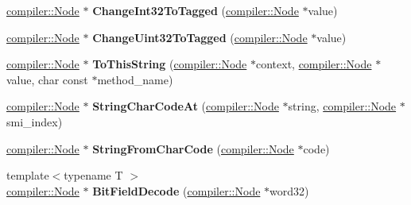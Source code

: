 \begin{DoxyCompactItemize}
\item 
\hyperlink{classv8_1_1internal_1_1compiler_1_1_node}{compiler\+::\+Node} $\ast$ {\bfseries Change\+Int32\+To\+Tagged} (\hyperlink{classv8_1_1internal_1_1compiler_1_1_node}{compiler\+::\+Node} $\ast$value)\hypertarget{classv8_1_1internal_1_1_code_stub_assembler_a14effc2655c4440dbef6090dbdcff437}{}\label{classv8_1_1internal_1_1_code_stub_assembler_a14effc2655c4440dbef6090dbdcff437}

\item 
\hyperlink{classv8_1_1internal_1_1compiler_1_1_node}{compiler\+::\+Node} $\ast$ {\bfseries Change\+Uint32\+To\+Tagged} (\hyperlink{classv8_1_1internal_1_1compiler_1_1_node}{compiler\+::\+Node} $\ast$value)\hypertarget{classv8_1_1internal_1_1_code_stub_assembler_aa9c411efc4ce30f9dfa85d808c87d0e5}{}\label{classv8_1_1internal_1_1_code_stub_assembler_aa9c411efc4ce30f9dfa85d808c87d0e5}

\item 
\hyperlink{classv8_1_1internal_1_1compiler_1_1_node}{compiler\+::\+Node} $\ast$ {\bfseries To\+This\+String} (\hyperlink{classv8_1_1internal_1_1compiler_1_1_node}{compiler\+::\+Node} $\ast$context, \hyperlink{classv8_1_1internal_1_1compiler_1_1_node}{compiler\+::\+Node} $\ast$value, char const $\ast$method\+\_\+name)\hypertarget{classv8_1_1internal_1_1_code_stub_assembler_a4f8ea41b61bec8d9b8e0ef9bc7197377}{}\label{classv8_1_1internal_1_1_code_stub_assembler_a4f8ea41b61bec8d9b8e0ef9bc7197377}

\item 
\hyperlink{classv8_1_1internal_1_1compiler_1_1_node}{compiler\+::\+Node} $\ast$ {\bfseries String\+Char\+Code\+At} (\hyperlink{classv8_1_1internal_1_1compiler_1_1_node}{compiler\+::\+Node} $\ast$string, \hyperlink{classv8_1_1internal_1_1compiler_1_1_node}{compiler\+::\+Node} $\ast$smi\+\_\+index)\hypertarget{classv8_1_1internal_1_1_code_stub_assembler_a4fe5131711262acc93abe09ebf04bcd9}{}\label{classv8_1_1internal_1_1_code_stub_assembler_a4fe5131711262acc93abe09ebf04bcd9}

\item 
\hyperlink{classv8_1_1internal_1_1compiler_1_1_node}{compiler\+::\+Node} $\ast$ {\bfseries String\+From\+Char\+Code} (\hyperlink{classv8_1_1internal_1_1compiler_1_1_node}{compiler\+::\+Node} $\ast$code)\hypertarget{classv8_1_1internal_1_1_code_stub_assembler_a16cd8b172f9f0a65e49a76af1ab06775}{}\label{classv8_1_1internal_1_1_code_stub_assembler_a16cd8b172f9f0a65e49a76af1ab06775}

\item 
{\footnotesize template$<$typename T $>$ }\\\hyperlink{classv8_1_1internal_1_1compiler_1_1_node}{compiler\+::\+Node} $\ast$ {\bfseries Bit\+Field\+Decode} (\hyperlink{classv8_1_1internal_1_1compiler_1_1_node}{compiler\+::\+Node} $\ast$word32)\hypertarget{classv8_1_1internal_1_1_code_stub_assembler_a5a5b366738b9fe3c72edf0dd291654fd}{}\label{classv8_1_1internal_1_1_code_stub_assembler_a5a5b366738b9fe3c72edf0dd291654fd}


\end{DoxyCompactItemize}
